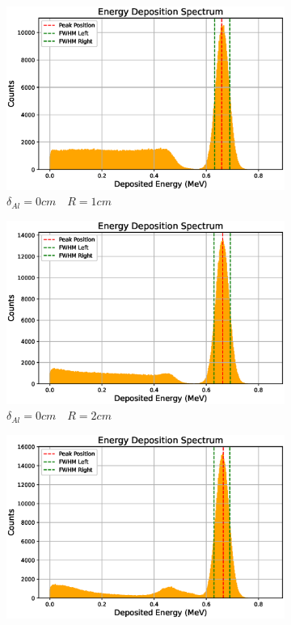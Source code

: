 \documentclass{article}
\begin{document}
\begin{figure}[H]
    \centering
    \begin{subfigure}[b]{0.3\textwidth}
        \centering
        \includegraphics[width=\textwidth]{000.eps}
        \caption{$\delta _{Al}=0cm\quad R=1cm$}
        \label{small_R}
    \end{subfigure}
    \hfill
    \begin{subfigure}[b]{0.3\textwidth}
        \centering
        \includegraphics[width=\textwidth]{001.eps}
        \caption{$\delta _{Al}=0cm\quad R=2cm$}
        \label{no_Al}
    \end{subfigure}
    \hfill
    \begin{subfigure}[b]{0.3\textwidth}
        \centering
        \includegraphics[width=\textwidth]{002.eps}

\end{subfigure}
\end{figure}
\end{document}
